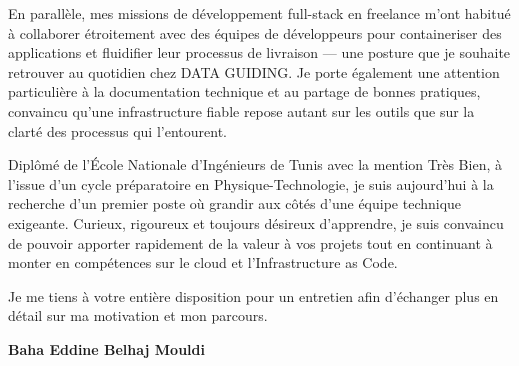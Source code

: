\documentclass[a4paper,11pt]{article}
\begin{document}
En parallèle, mes missions de développement full-stack en freelance m'ont habitué à collaborer étroitement avec des équipes de développeurs pour containeriser des applications et fluidifier leur processus de livraison --- une posture que je souhaite retrouver au quotidien chez DATA GUIDING. Je porte également une attention particulière à la documentation technique et au partage de bonnes pratiques, convaincu qu'une infrastructure fiable repose autant sur les outils que sur la clarté des processus qui l'entourent.

Diplômé de l'École Nationale d'Ingénieurs de Tunis avec la mention Très Bien, à l'issue d'un cycle préparatoire en Physique-Technologie, je suis aujourd'hui à la recherche d'un premier poste où grandir aux côtés d'une équipe technique exigeante. Curieux, rigoureux et toujours désireux d'apprendre, je suis convaincu de pouvoir apporter rapidement de la valeur à vos projets tout en continuant à monter en compétences sur le cloud et l'Infrastructure as Code.

Je me tiens à votre entière disposition pour un entretien afin d'échanger plus en détail sur ma motivation et mon parcours.

\vspace{0.8cm}

\begin{flushright}
{\bfseries Baha Eddine Belhaj Mouldi}
\end{flushright}
\end{document}
